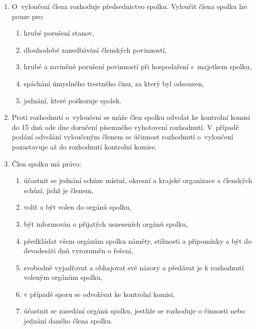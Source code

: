 \documentclass[a4paper]{article}
\begin{document}
\begin{enumerate}
    \item O~vyloučení člena rozhoduje předsednictvo spolku. Vyloučit člena
        spolku lze pouze pro:
        \begin{enumerate}
        \item hrubé porušení stanov,
        \item dlouhodobé zanedbávání členských povinností,
        \item hrubé a zaviněné porušení povinností při hospodaření s~majetkem
            spolku,
        \item spáchání úmyslného trestného činu, za který byl odsouzen,
        \item jednání, které poškozuje spolek.
        \end{enumerate}

    \item Proti rozhodnutí o~vyloučení se může člen spolku odvolat ke
        kontrolní komisi do 15 dnů ode dne doručení písemného vyhotovení
        rozhodnutí. V~případě podání odvolání vyloučeným členem se účinnost
        rozhodnutí o~vyloučení pozastavuje až do rozhodnutí kontrolní komise.

    \item Člen spolku má právo:
        \begin{enumerate}
        \item účastnit se jednání schůze místní, okresní a krajské organizace
        a členských schůzí, jichž je členem,

        \item volit a být volen do orgánů spolku,

        \item být informován o přijatých usneseních orgánů spolku,

        \item předkládat všem orgánům spolku náměty, stížnosti a připomínky
        a být do devadesáti dnů vyrozuměn o řešení,

        \item svobodně vyjadřovat a obhajovat své názory a předávat je
        k rozhodnutí voleným orgánům spolku,

        \item v případě sporu se odvolávat ke kontrolní komisi,

        \item účastnit se zasedání orgánů spolku, jestliže se rozhoduje
        o činnosti nebo jednání daného člena spolku.
        \end{enumerate}


\end{enumerate}
\end{document}
